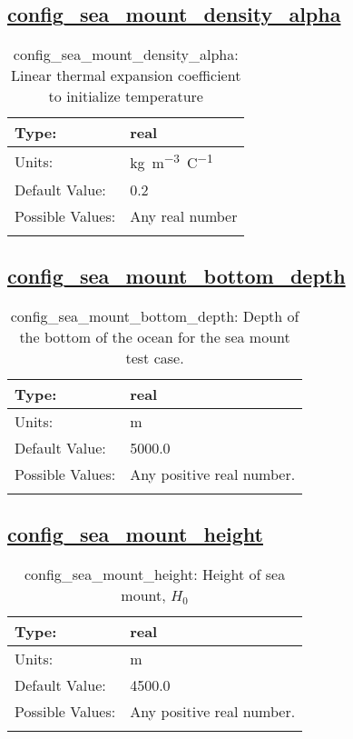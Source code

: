 \subsection[config\_sea\_mount\_density\_alpha]{\hyperref[sec:nm_tab_sea_mount]{config\_sea\_mount\_density\_alpha}}
\label{subsec:nm_sec_config_sea_mount_density_alpha}
\begin{center}
\begin{longtable}{| p{2.0in} || p{4.0in} |}
    \hline
    Type: & real \\
    \hline
    Units: & \si{kg.m^{-3}.C^{-1}} \\
    \hline
    Default Value: & 0.2 \\
    \hline
    Possible Values: & Any real number \\
    \hline
    \caption{config\_sea\_mount\_density\_alpha: Linear thermal expansion coefficient to initialize temperature}
\end{longtable}
\end{center}
\subsection[config\_sea\_mount\_bottom\_depth]{\hyperref[sec:nm_tab_sea_mount]{config\_sea\_mount\_bottom\_depth}}
\label{subsec:nm_sec_config_sea_mount_bottom_depth}
\begin{center}
\begin{longtable}{| p{2.0in} || p{4.0in} |}
    \hline
    Type: & real \\
    \hline
    Units: & \si{m} \\
    \hline
    Default Value: & 5000.0 \\
    \hline
    Possible Values: & Any positive real number. \\
    \hline
    \caption{config\_sea\_mount\_bottom\_depth: Depth of the bottom of the ocean for the sea mount test case.}
\end{longtable}
\end{center}
\subsection[config\_sea\_mount\_height]{\hyperref[sec:nm_tab_sea_mount]{config\_sea\_mount\_height}}
\label{subsec:nm_sec_config_sea_mount_height}
\begin{center}
\begin{longtable}{| p{2.0in} || p{4.0in} |}
    \hline
    Type: & real \\
    \hline
    Units: & \si{m} \\
    \hline
    Default Value: & 4500.0 \\
    \hline
    Possible Values: & Any positive real number. \\
    \hline
    \caption{config\_sea\_mount\_height: Height of sea mount, $H_0$}
\end{longtable}
\end{center}
